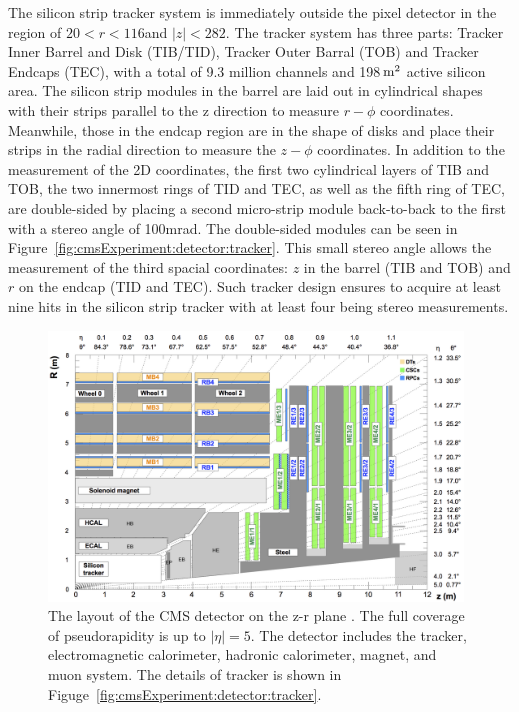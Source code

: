 The silicon strip tracker system is immediately outside the pixel detector in the region of $20<r<116$\cm and $|z|<282$\cm. The tracker system has three parts: Tracker Inner Barrel and Disk (TIB/TID), Tracker Outer Barral (TOB) and Tracker Endcaps (TEC), with a total of 9.3 million channels and 198\,$\rm m^2$ active silicon area. The silicon strip modules in the barrel are laid out in cylindrical shapes with their strips parallel to the z direction to measure $r-\phi$ coordinates. Meanwhile, those in the endcap region are in the shape of disks and place their strips in the radial direction to measure the $z-\phi$ coordinates. In addition to the measurement of the 2D coordinates, the first two cylindrical layers of TIB and TOB, the two innermost rings of TID and TEC, as well as the fifth ring of TEC, are double-sided by placing a second micro-strip module back-to-back to the first with a stereo angle of 100\unit{mrad}. The double-sided modules can be seen in Figure~\ref{fig:cmsExperiment:detector:tracker}. This small stereo angle allows the measurement of the third spacial coordinates: $z$ in the barrel (TIB and TOB) and $r$ on the endcap (TID and TEC). Such tracker design ensures to acquire at least nine hits in the silicon strip tracker with at least four being stereo measurements. 




\begin{figure}[ht]
    \centering
    \includegraphics[width=0.98\textwidth]{chapters/CMSExperiment/sectionDetector/figures/detectorLayout.png}
    \caption{The layout of the CMS detector on the z-r plane \cite{cms:muonChamberWebsite}. The full coverage of pseudorapidity is up to $|\eta|=5$. The detector includes the tracker, electromagnetic calorimeter, hadronic calorimeter, magnet, and muon system. The details of tracker is shown in Figuge~\ref{fig:cmsExperiment:detector:tracker}. }
    \label{fig:cmsExperiment:detector:detectorLayout}
\end{figure}





